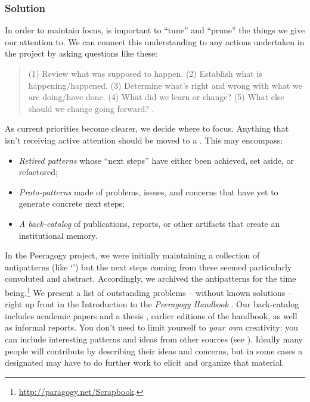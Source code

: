 \subsubsection*{Solution}
In order to maintain focus, is important to ``tune'' and ``prune'' the
things we give our attention to.  We can connect this understanding to
any actions undertaken in the project by asking questions like these:
\begin{quote}
(1) Review what was supposed to happen.
(2) Establish what is happening/happened.
(3) Determine what’s right and wrong with what we are doing/have done.
(4) What did we learn or change? 
(5) What else should we change going forward?  \cite[Chapter 28]{peeragogy-handbook}.
\end{quote}
%
As current priorities become clearer, we decide where to focus.
Anything that isn't receiving active attention should be moved to a
.  This may encompass:
\begin{itemize}
\item \emph{Retired patterns} whose ``next steps'' have either been
  achieved, set aside, or refactored;
\item \emph{Proto-patterns} made of problems, issues, and concerns
  that have yet to generate concrete next steps;
\item \emph{A back-catalog} of publications, reports, or other
  artifacts that create an institutional memory.
\end{itemize}
In the Peeragogy project, we were initially maintaining a collection
of antipatterns (like `') but the
next steps coming from these seemed particularly convoluted and
abstract.  Accordingly, we archived the antipatterns for the time
being.\footnote{\url{http://paragogy.net/Scrapbook}.}  We present a
list of outstanding problems -- without known solutions -- right up
front in the Introduction to the \emph{Peeragogy Handbook}
\cite[Chapter 1]{peeragogy-handbook}.  Our back-catalog includes
academic papers
\cite{building-peeragogy-accelerator,corneli2013inaction,corneli2012paragogical,paragogy-okcon}
and a thesis \cite{corneli-thesis}, earlier editions of the handbook,
as well as informal reports.
%
You don't need to limit
yourself to \emph{your own} creativity: you can include interesting
patterns and ideas from other sources (see ). Ideally many people will contribute by describing their
ideas and concerns, but in some cases a designated
 may have to do further work to elicit and
organize that material.

